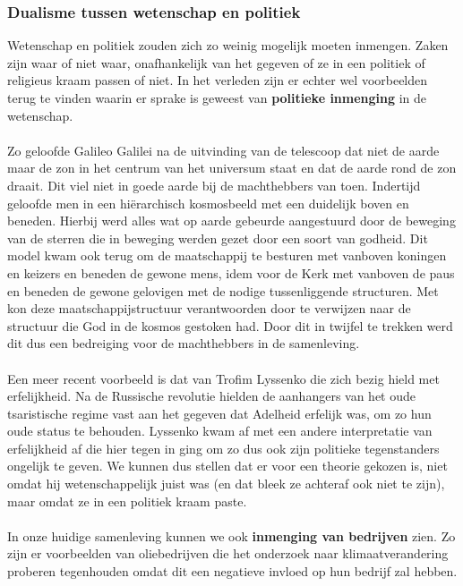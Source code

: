 \documentclass[../summary.tex]{subfiles}
\begin{document}
	\subsubsection{Dualisme tussen wetenschap en politiek}
	
	Wetenschap en politiek zouden zich zo weinig mogelijk moeten inmengen. Zaken zijn waar of niet waar, onafhankelijk van het gegeven of ze in een politiek of religieus kraam passen of niet. In het verleden zijn er echter wel voorbeelden terug te vinden waarin er sprake is geweest van \textbf{politieke inmenging} in de wetenschap. 
	\\\\
	Zo geloofde Galileo Galilei na de uitvinding van de telescoop dat niet de aarde maar de zon in het centrum van het universum staat en dat de aarde rond de zon draait. Dit viel niet in goede aarde bij de machthebbers van toen. Indertijd geloofde men in een hiërarchisch kosmosbeeld met een duidelijk boven en beneden. Hierbij werd alles wat  op aarde gebeurde aangestuurd door de beweging van de sterren die in beweging werden gezet door een soort van godheid. Dit model kwam ook terug om de maatschappij te besturen met vanboven koningen en keizers en beneden de gewone mens, idem voor de Kerk met vanboven de paus en beneden de gewone gelovigen met de nodige tussenliggende structuren. Met kon deze maatschappijstructuur verantwoorden door te verwijzen naar de structuur die God in de kosmos gestoken had. Door dit in twijfel te trekken werd dit dus een bedreiging voor de machthebbers in de samenleving. 
	\\\\
	Een meer recent voorbeeld is dat van Trofim Lyssenko die zich bezig hield met erfelijkheid. Na de Russische revolutie hielden de aanhangers van het oude tsaristische regime vast aan het gegeven dat Adelheid erfelijk was, om zo hun oude status te behouden. Lyssenko kwam af met een andere interpretatie van erfelijkheid af die hier tegen in ging om zo dus ook zijn politieke tegenstanders ongelijk te geven. We kunnen dus stellen dat er voor een theorie gekozen is, niet omdat hij wetenschappelijk juist was (en dat bleek ze achteraf ook niet te zijn), maar omdat ze in een politiek kraam paste. 
	\\\\
	In onze huidige samenleving kunnen we ook \textbf{inmenging van bedrijven} zien. Zo zijn er voorbeelden van oliebedrijven die het onderzoek naar klimaatverandering proberen tegenhouden omdat dit een negatieve invloed op hun bedrijf zal hebben. 
\end{document}
